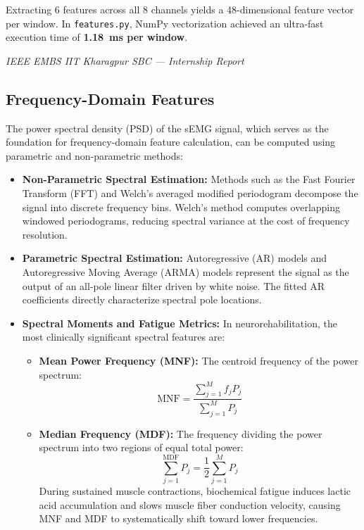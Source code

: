 \documentclass[12pt,a4paper]{article}
\begin{document}
Extracting 6 features across all 8 channels yields a 48-dimensional feature vector per window. In \texttt{features.py}, NumPy vectorization achieved an ultra-fast execution time of \textbf{1.18~ms per window}.

\vfill
\begin{center}
    \footnotesize\textit{IEEE EMBS IIT Kharagpur SBC --- Internship Report}
\end{center}

\newpage
\subsection{Frequency-Domain Features}

The power spectral density (PSD) of the sEMG signal, which serves as the foundation for frequency-domain feature calculation, can be computed using parametric and non-parametric methods:
\begin{itemize}[leftmargin=*]
    \item \textbf{Non-Parametric Spectral Estimation:} Methods such as the Fast Fourier Transform (FFT) and Welch's averaged modified periodogram decompose the signal into discrete frequency bins. Welch's method computes overlapping windowed periodograms, reducing spectral variance at the cost of frequency resolution.
    \item \textbf{Parametric Spectral Estimation:} Autoregressive (AR) models and Autoregressive Moving Average (ARMA) models represent the signal as the output of an all-pole linear filter driven by white noise. The fitted AR coefficients directly characterize spectral pole locations.
    \item \textbf{Spectral Moments and Fatigue Metrics:} In neurorehabilitation, the most clinically significant spectral features are:
    \begin{itemize}
        \item \textbf{Mean Power Frequency (MNF):} The centroid frequency of the power spectrum:
        \begin{equation}
            \text{MNF} = \frac{\sum_{j=1}^{M} f_j P_j}{\sum_{j=1}^{M} P_j}
        \end{equation}
        \item \textbf{Median Frequency (MDF):} The frequency dividing the power spectrum into two regions of equal total power:
        \begin{equation}
            \sum_{j=1}^{\text{MDF}} P_j = \frac{1}{2} \sum_{j=1}^{M} P_j
        \end{equation}
        During sustained muscle contractions, biochemical fatigue induces lactic acid accumulation and slows muscle fiber conduction velocity, causing MNF and MDF to systematically shift toward lower frequencies.
    \end{itemize}
\end{itemize}
\end{document}
